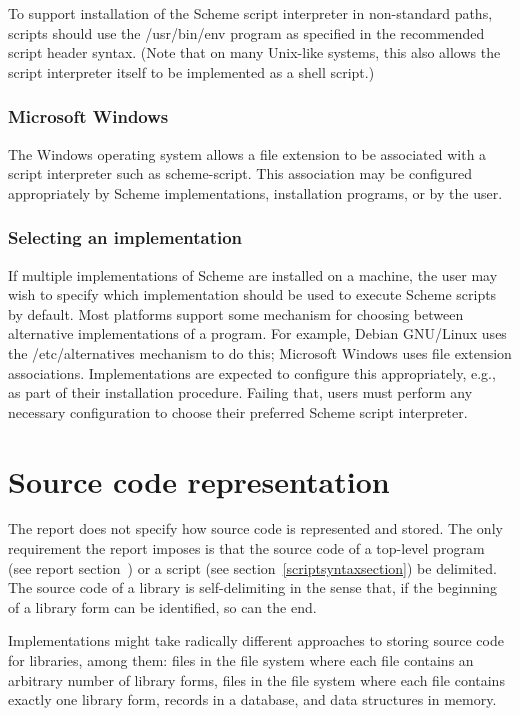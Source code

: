 \documentclass[twoside,twocolumn]{algol60}
\begin{document}
To support installation of the Scheme script interpreter in 
non-standard paths, scripts should use the {\cf /usr/bin/env} 
program as specified in the recommended script header syntax.  
(Note that on many Unix-like systems, this also allows the 
script interpreter itself to be implemented as a shell script.)

\subsection{Microsoft Windows}
The Windows operating system allows a file extension to be associated 
with a script interpreter such as {\cf scheme-script}.  This 
association may be configured appropriately by Scheme implementations, 
installation programs, or by the user.

\subsection{Selecting an implementation}
If multiple implementations of Scheme are installed on a machine, the
user may wish to specify which implementation should be used to 
execute Scheme scripts by default.  Most platforms support some 
mechanism for choosing between alternative implementations of a 
program.  For example, Debian GNU/Linux uses the {\cf /etc/alternatives} 
mechanism to do this; Microsoft Windows uses file extension 
associations.  Implementations are expected to configure this 
appropriately, e.g., as part of their installation procedure.
Failing that, users must perform any necessary configuration to 
choose their preferred Scheme script interpreter.

\chapter{Source code representation}
\label{sourcecoderepappendix}

The report does not specify how source code is represented and stored.
The only requirement the report imposes is that the source code of a
top-level program (see report
section~) or a script (see section~\ref{scriptsyntaxsection}) be
delimited.  The source code of a library is self-delimiting in the
sense that, if the beginning of a library form can be identified, so
can the end.

Implementations might take radically different approaches to storing
source code for libraries, among them: files in the file system where
each file contains an arbitrary number of library forms, files in the
file system where each file contains exactly one library form, records
in a database, and data structures in memory.
\end{document}
